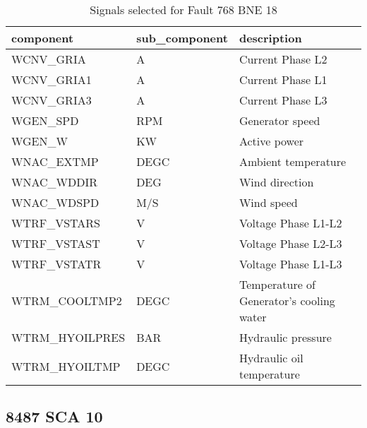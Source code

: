 \begin{table}[!ht]
    \centering
    \begin{tabular}{|l|l|l|}
    \hline
        component & sub\_component & description \\ \hline
        WCNV\_GRIA & A & Current Phase L2 \\ \hline
        WCNV\_GRIA1 & A & Current Phase L1 \\ \hline
        WCNV\_GRIA3 & A & Current Phase L3 \\ \hline
        WGEN\_SPD & RPM & Generator speed \\ \hline
        WGEN\_W & KW & Active power \\ \hline
        WNAC\_EXTMP & DEGC & Ambient temperature \\ \hline
        WNAC\_WDDIR & DEG & Wind direction \\ \hline
        WNAC\_WDSPD & M/S & Wind speed \\ \hline
        WTRF\_VSTARS & V & Voltage Phase L1-L2 \\ \hline
        WTRF\_VSTAST & V & Voltage Phase L2-L3 \\ \hline
        WTRF\_VSTATR & V & Voltage Phase L1-L3 \\ \hline
        WTRM\_COOLTMP2 & DEGC & Temperature of Generator's cooling water \\ \hline
        WTRM\_HYOILPRES & BAR & Hydraulic pressure \\ \hline
        WTRM\_HYOILTMP & DEGC & Hydraulic oil temperature \\ \hline
    \end{tabular}
    \caption{Signals selected for Fault 768 BNE 18}
\end{table}

\subsection{8487 SCA 10}

